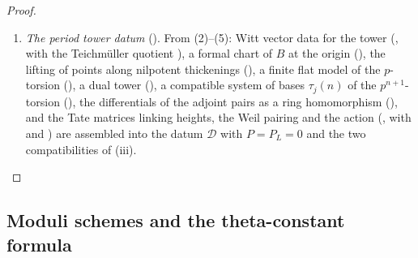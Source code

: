 \begin{proof}
\begin{enumerate}[label=(\arabic*)]
generators along multiplication by $N$ () and the
generation of torsion ().
\item \emph{The period tower datum} (). From (2)--(5): Witt vector data for
the tower (, with the Teichm\"uller quotient
), a formal chart of $B$ at the origin
(), the lifting of points along nilpotent thickenings
(), a finite flat model of the $p$-torsion
(), a dual tower (), a compatible system of
bases $\tau_j(n)$ of the $p^{n+1}$-torsion (), the
differentials of the adjoint pairs as a ring homomorphism (),
and the Tate matrices linking heights, the Weil pairing and the action
(, with  and
) are assembled into the datum $\mathcal D$ with $P=P_L=0$ and the two
compatibilities of (iii).
\end{enumerate}
\end{proof}

\subsection{Moduli schemes and the theta-constant formula}\label{sec:pf:sh-local:moduli}

